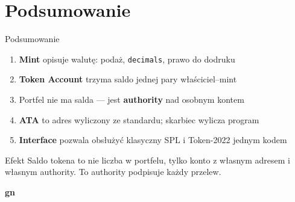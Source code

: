 \section{Podsumowanie}

\begin{frame}{Podsumowanie}
  \begin{enumerate}
    \item \textbf{Mint} opisuje walutę: podaż, \texttt{decimals}, prawo do dodruku
    \item \textbf{Token Account} trzyma saldo jednej pary właściciel--mint
    \item Portfel nie ma salda --- jest \textbf{authority} nad osobnym kontem
    \item \textbf{ATA} to adres wyliczony ze standardu; skarbiec wylicza program
    \item \textbf{Interface} pozwala obsłużyć klasyczny SPL i Token-2022 jednym kodem
  \end{enumerate}
  \vspace{0.2cm}
  \begin{exampleblock}{Efekt}
    Saldo tokena to nie liczba w portfelu, tylko konto z własnym adresem
    i własnym authority. To authority podpisuje każdy przelew.
  \end{exampleblock}
\end{frame}

\begin{frame}[plain]
  \begin{center}
    \vfill
    {\Huge\bfseries\color{stplwhite} gn}
    \vfill
  \end{center}
\end{frame}


